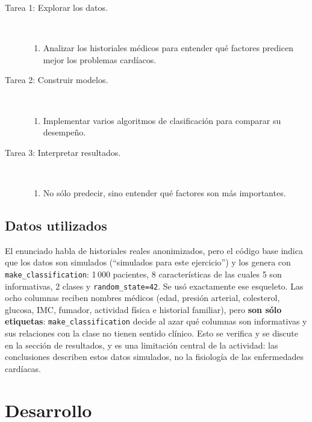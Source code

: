 \documentclass[11pt,letterpaper]{article}
\begin{document}
\begin{description}
    \item[Tarea 1: Explorar los datos.]\mbox{}\\[-1.3\baselineskip]
    \begin{enumerate}
        \item Analizar los historiales médicos para entender qué factores predicen mejor los problemas cardíacos.
    \end{enumerate}
    \item[Tarea 2: Construir modelos.]\mbox{}\\[-1.3\baselineskip]
    \begin{enumerate}
        \item Implementar varios algoritmos de clasificación para comparar su desempeño.
    \end{enumerate}
    \item[Tarea 3: Interpretar resultados.]\mbox{}\\[-1.3\baselineskip]
    \begin{enumerate}
        \item No sólo predecir, sino entender qué factores son más importantes.
    \end{enumerate}
\end{description}

\subsection*{Datos utilizados}

El enunciado habla de historiales reales anonimizados, pero el código base indica que los datos son simulados (``simulados para este ejercicio'') y los genera con \texttt{make\_classification}: 1\,000 pacientes, 8 características de las cuales 5 son informativas, 2 clases y \texttt{random\_state=42}. Se usó exactamente ese esqueleto. Las ocho columnas reciben nombres médicos (edad, presión arterial, colesterol, glucosa, IMC, fumador, actividad física e historial familiar), pero \textbf{son sólo etiquetas}: \texttt{make\_classification} decide al azar qué columnas son informativas y sus relaciones con la clase no tienen sentido clínico. Esto se verifica y se discute en la sección de resultados, y es una limitación central de la actividad: las conclusiones describen estos datos simulados, no la fisiología de las enfermedades cardíacas.

\section{Desarrollo}
\end{document}

